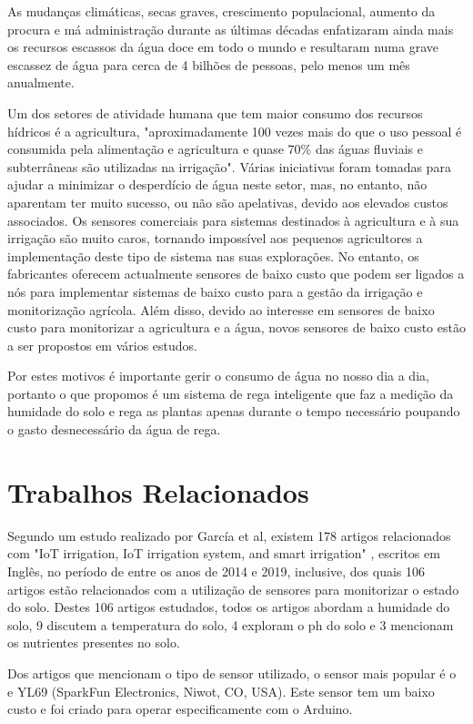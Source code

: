 \documentclass[conference]{IEEEtran}
\begin{document}
As mudanças climáticas, secas graves, crescimento populacional, aumento da procura e má 
administração durante as últimas décadas enfatizaram ainda mais os recursos escassos da água 
doce em todo o mundo e resultaram numa grave escassez de água para cerca de 4 bilhões de pessoas, 
pelo menos um mês anualmente. \cite{salehi2022global}

Um dos setores de atividade humana que tem maior consumo dos recursos hídricos é a agricultura, 
"aproximadamente 100 vezes mais do que o uso pessoal é consumida pela alimentação e agricultura 
e quase 70\% das águas fluviais e subterrâneas são utilizadas na irrigação". \cite{nawandar2019iot} 
Várias iniciativas foram tomadas para ajudar a minimizar o desperdício de água neste setor, 
mas, no entanto, não aparentam ter muito sucesso, ou não são apelativas, devido aos 
elevados custos associados. Os sensores comerciais para sistemas destinados à 
agricultura e à sua irrigação são muito caros, tornando impossível aos pequenos 
agricultores a implementação deste tipo de sistema nas suas explorações. 
No entanto, os fabricantes oferecem actualmente sensores de baixo custo que podem 
ser ligados a nós para implementar sistemas de baixo custo para a gestão da 
irrigação e monitorização agrícola. Além disso, devido ao interesse em sensores de 
baixo custo para monitorizar a agricultura e a água, 
novos sensores de baixo custo estão a ser propostos em vários estudos. \cite{garcia2020iot}

Por estes motivos é importante gerir o consumo de água no nosso dia a dia, portanto o que 
propomos é um sistema de rega inteligente que faz a medição da humidade do solo e rega 
as plantas apenas durante o tempo necessário poupando o gasto desnecessário da água de rega.

\section{Trabalhos Relacionados}
Segundo um estudo realizado por García et al, existem 178 artigos relacionados com  
"IoT irrigation, IoT irrigation system, and smart irrigation" \cite{garcia2020iot}, escritos em Inglês, 
no período de entre os anos de 2014 e 2019, inclusive, dos quais 106 artigos estão 
relacionados com a utilização de sensores para monitorizar o estado do solo. 
Destes 106 artigos estudados, todos os artigos abordam a humidade do solo, 
9 discutem a temperatura do solo, 4 exploram o ph do solo e 3 mencionam os 
nutrientes presentes no solo.

Dos artigos que mencionam o tipo de sensor utilizado, o sensor mais popular é o 
e YL69 (SparkFun Electronics, Niwot, CO, USA). Este sensor tem um baixo custo e 
foi criado para operar especificamente com o Arduino. \cite{garcia2020iot}
\end{document}
